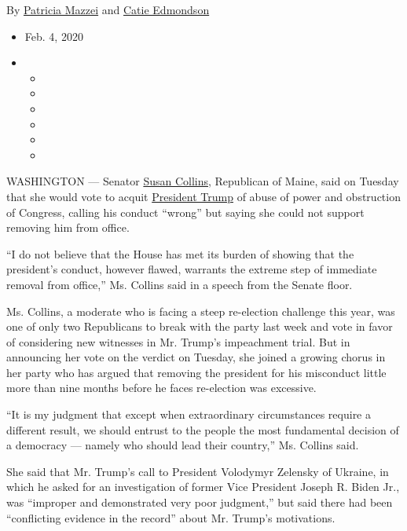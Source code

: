 By \href{https://www.nytimes3xbfgragh.onion/by/patricia-mazzei}{Patricia
Mazzei} and
\href{https://www.nytimes3xbfgragh.onion/by/catie-edmondson}{Catie
Edmondson}

\begin{itemize}
\item
  Feb. 4, 2020
\item
  \begin{itemize}
  \item
  \item
  \item
  \item
  \item
  \item
  \end{itemize}
\end{itemize}

WASHINGTON --- Senator
\href{https://www.nytimes3xbfgragh.onion/2020/07/07/us/politics/susan-collins-maine-sara-gideon.html}{Susan
Collins}, Republican of Maine, said on Tuesday that she would vote to
acquit
\href{https://www.nytimes3xbfgragh.onion/2020/02/04/us/politics/state-of-the-union-address.html}{President
Trump} of abuse of power and obstruction of Congress, calling his
conduct ``wrong'' but saying she could not support removing him from
office.

``I do not believe that the House has met its burden of showing that the
president's conduct, however flawed, warrants the extreme step of
immediate removal from office,'' Ms. Collins said in a speech from the
Senate floor.

Ms. Collins, a moderate who is facing a steep re-election challenge this
year, was one of only two Republicans to break with the party last week
and vote in favor of considering new witnesses in Mr. Trump's
impeachment trial. But in announcing her vote on the verdict on Tuesday,
she joined a growing chorus in her party who has argued that removing
the president for his misconduct little more than nine months before he
faces re-election was excessive.

``It is my judgment that except when extraordinary circumstances require
a different result, we should entrust to the people the most fundamental
decision of a democracy --- namely who should lead their country,'' Ms.
Collins said.

She said that Mr. Trump's call to President Volodymyr Zelensky of
Ukraine, in which he asked for an investigation of former Vice President
Joseph R. Biden Jr., was ``improper and demonstrated very poor
judgment,'' but said there had been ``conflicting evidence in the
record'' about Mr. Trump's motivations.


